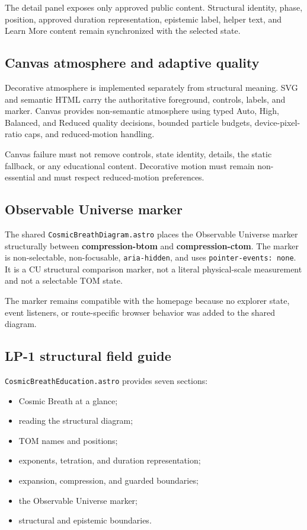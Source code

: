 \documentclass[11pt,letterpaper]{article}
\newcommand{\filepath}[1]{\nolinkurl{#1}}
\newcommand{\term}[1]{\textbf{\textsf{#1}}}
\begin{document}
The detail panel exposes only approved public content. Structural identity,
phase, position, approved duration representation, epistemic label, helper text,
and Learn More content remain synchronized with the selected state.

\subsection{Canvas atmosphere and adaptive quality}

Decorative atmosphere is implemented separately from structural meaning. SVG and
semantic HTML carry the authoritative foreground, controls, labels, and marker.
Canvas provides non-semantic atmosphere using typed Auto, High, Balanced, and
Reduced quality decisions, bounded particle budgets, device-pixel-ratio caps,
and reduced-motion handling.

Canvas failure must not remove controls, state identity, details, the static
fallback, or any educational content. Decorative motion must remain
non-essential and must respect reduced-motion preferences.

\subsection{Observable Universe marker}

The shared \filepath{CosmicBreathDiagram.astro} places the Observable Universe
marker structurally between \term{compression-btom} and \term{compression-ctom}.
The marker is non-selectable, non-focusable, \texttt{aria-hidden}, and uses
\texttt{pointer-events: none}. It is a CU structural comparison marker, not a
literal physical-scale measurement and not a selectable TOM state.

The marker remains compatible with the homepage because no explorer state,
event listeners, or route-specific browser behavior was added to the shared
diagram.

\subsection{LP-1 structural field guide}

\filepath{CosmicBreathEducation.astro} provides seven sections:

\begin{itemize}
    \item Cosmic Breath at a glance;
    \item reading the structural diagram;
    \item TOM names and positions;
    \item exponents, tetration, and duration representation;
    \item expansion, compression, and guarded boundaries;
    \item the Observable Universe marker;
    \item structural and epistemic boundaries.
\end{itemize}
\end{document}
